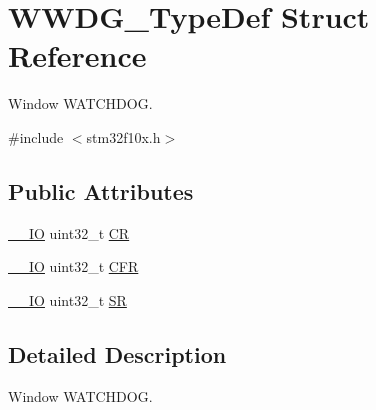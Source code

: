 \hypertarget{struct_w_w_d_g___type_def}{\section{W\-W\-D\-G\-\_\-\-Type\-Def Struct Reference}
\label{struct_w_w_d_g___type_def}
}


Window W\-A\-T\-C\-H\-D\-O\-G.  




{\ttfamily \#include $<$stm32f10x.\-h$>$}

\subsection*{Public Attributes}
\begin{DoxyCompactItemize}
\item 
\hyperlink{group___c_m_s_i_s__core__definitions_gaec43007d9998a0a0e01faede4133d6be}{\-\_\-\-\_\-\-I\-O} uint32\-\_\-t \hyperlink{struct_w_w_d_g___type_def_a4caf530d45f7428c9700d9c0057135f8}{C\-R}
\item 
\hyperlink{group___c_m_s_i_s__core__definitions_gaec43007d9998a0a0e01faede4133d6be}{\-\_\-\-\_\-\-I\-O} uint32\-\_\-t \hyperlink{struct_w_w_d_g___type_def_adcd6a7e5d75022e46ce60291f4b8544c}{C\-F\-R}
\item 
\hyperlink{group___c_m_s_i_s__core__definitions_gaec43007d9998a0a0e01faede4133d6be}{\-\_\-\-\_\-\-I\-O} uint32\-\_\-t \hyperlink{struct_w_w_d_g___type_def_a15655cda4854cc794db1f27b3c0bba38}{S\-R}
\end{DoxyCompactItemize}


\subsection{Detailed Description}
Window W\-A\-T\-C\-H\-D\-O\-G. 

